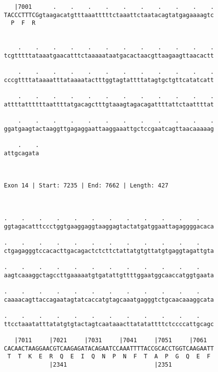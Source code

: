 \documentclass{article}
\begin{document}
\begin{Verbatim}
   |7001      .    .    .    .    .    .    .    .    .    .
TACCCTTTCGgtaagacatgtttaaatttttctaaattctaatacagtatgagaaaagtc
  P  F  R                                                   
                                                            
  
    .    .    .    .    .    .    .    .    .    .    .    .
tcgtttttataaatgaacatttctaaaaataatgacactaacgttaagaagttaacactt
                                                            
    .    .    .    .    .    .    .    .    .    .    .    .
cccgttttataaaatttataaaatactttggtagtattttatagtgctgttcatatcatt
                                                            
    .    .    .    .    .    .    .    .    .    .    .    .
attttattttttaattttatgacagctttgtaaagtagacagattttattctaattttat
                                                            
    .    .    .    .    .    .    .    .    .    .    .    .
ggatgaagtactaaggttgagaggaattaaggaaattgctccgaatcagttaacaaaaag
                                                            
    .    .
attgcagata
          
          
 
Exon 14 | Start: 7235 | End: 7662 | Length: 427



.    .    .    .    .    .    .    .    .    .    .    .    
ggtagacatttccctggtgaaggaggtaaggagtactatgatggaattagaggggacaca
                                                            
.    .    .    .    .    .    .    .    .    .    .    .    
ctgagagggtccacacttgacagactctcttctattatgtgttatgtgaggtagattgta
                                                            
.    .    .    .    .    .    .    .    .    .    .    .    
aagtcaaaggctagccttgaaaaatgtgatattgttttggaatggcaaccatggtgaata
                                                            
.    .    .    .    .    .    .    .    .    .    .    .    
caaaacagttaccagaatagtatcaccatgtagcaaatgagggtctgcaacaaaggcata
                                                            
.    .    .    .    .    .    .    .    .    .    .    .    
ttcctaaatatttatatgtgtactagtcaataaacttatatattttctccccattgcagc
                                                            
   |7011     |7021     |7031     |7041     |7051     |7061  
CACAACTAAGGAACGTCAAGAGATACAGAATCCAAATTTTACCGCACCTGGTCAAGAATT
 T  T  K  E  R  Q  E  I  Q  N  P  N  F  T  A  P  G  Q  E  F 
             |2341                         |2351            
  

\end{Verbatim}
\end{document}
